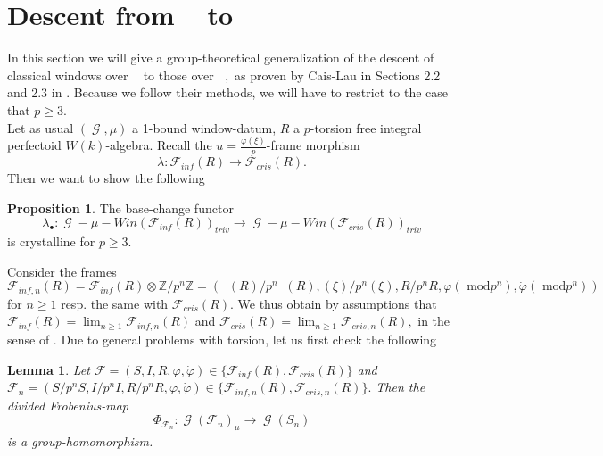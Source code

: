 \documentclass[a4paper,10,5 pt]{amsart}
\newtheorem{Lemma}[Satz]{Lemma}
\theoremstyle{definition}
\newtheorem{proposition}[Satz]{Proposition}
\DeclareMathOperator{\Acris}{\mathbb{A}_{cris}}
\DeclareMathOperator{\Ainf}{\mathbb{A}_{inf}}
\DeclareMathOperator{\G}{\mathcal{G}}
\begin{document}
\section{Descent from $\Acris$ to $\Ainf$}
In this section we will give a group-theoretical generalization of the descent of classical windows over $\Acris$ to those over $\Ainf,$ as proven by Cais-Lau in Sections 2.2 and 2.3 in \cite{Cais-Lau}. Because we follow their methods, we will have to restrict to the case that $p\geq 3.$
\\
Let as usual $(\G,\mu)$ a 1-bound window-datum, $R$ a $p$-torsion free integral perfectoid $W(k)$-algebra. Recall the $u=\frac{\varphi(\xi)}{p}$-frame morphism
$$
\lambda\colon \mathcal{F}_{inf}(R)\rightarrow \mathcal{F}_{cris}(R).
$$
Then we want to show the following
\begin{proposition}\label{Deszent von Acris nach Ainf}
The base-change functor
$$
\lambda_{\bullet}\colon \G-\mu-Win(\mathcal{F}_{inf}(R))_{triv}\rightarrow \G-\mu-Win(\mathcal{F}_{cris}(R))_{triv}
$$
is crystalline for $p\geq 3.$
\end{proposition}
Consider the frames $$\mathcal{F}_{inf,n}(R)=\mathcal{F}_{inf}(R)\otimes \mathbb{Z}/p^{n}\mathbb{Z} = (\Ainf(R)/p^{n}\Ainf(R),(\xi)/p^{n}(\xi),R/p^{n}R,\varphi (\text{ mod}p^{n}), \dot{\varphi} (\text{ mod}p^{n}))$$ for $n\geq 1$ resp. the same with $\mathcal{F}_{cris}(R).$ We thus obtain by assumptions that $\mathcal{F}_{inf}(R)=\lim_{n\geq 1}\mathcal{F}_{inf,n}(R)$ and $\mathcal{F}_{cris}(R)=\lim_{n\geq 1} \mathcal{F}_{cris,n}(R),$ in the sense of \cite[Section 2]{frames finite-groupschemes}. Due to general problems with torsion, let us first check the following
\begin{Lemma}
Let $\mathcal{F}=(S,I,R,\varphi,\dot{\varphi})\in \lbrace \mathcal{F}_{inf}(R), \mathcal{F}_{cris}(R)\rbrace$ and $\mathcal{F}_{n}=(S/p^{n}S,I/p^{n}I,R/p^{n}R,\varphi,\dot{\varphi})\in \lbrace \mathcal{F}_{inf,n}(R), \mathcal{F}_{cris,n}(R)\rbrace.$ Then the divided Frobenius-map
$$
\Phi_{\mathcal{F}_{n}}\colon \G(\mathcal{F}_{n})_{\mu}\rightarrow \G(S_{n})
$$
is a group-homomorphism.
\end{Lemma}
\end{document}
